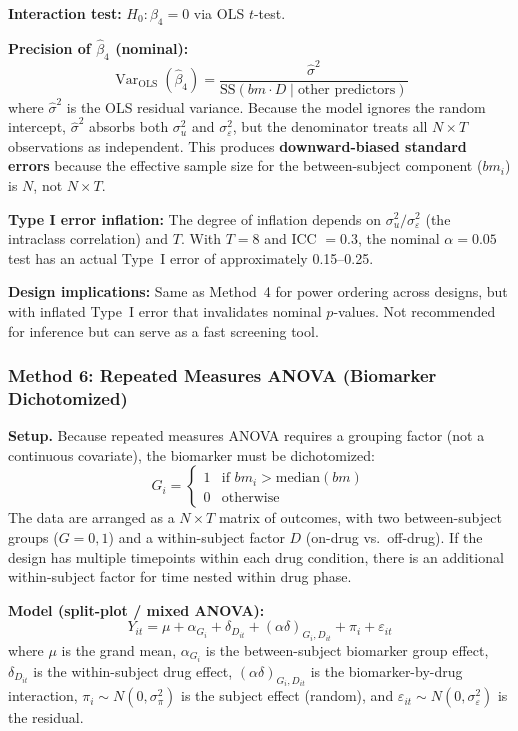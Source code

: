 \documentclass[11pt]{article}
\begin{document}
\textbf{Interaction test:} $H_0: \beta_4 = 0$ via OLS $t$-test.

\textbf{Precision of $\hat{\beta}_4$ (nominal):}
\[
\operatorname{Var}_{\text{OLS}}(\hat{\beta}_4) =
\frac{\hat{\sigma}^2}{\text{SS}(bm \cdot D \mid
\text{other predictors})}
\]
where $\hat{\sigma}^2$ is the OLS residual variance. Because the model
ignores the random intercept, $\hat{\sigma}^2$ absorbs both
$\sigma^2_u$ and $\sigma^2_\varepsilon$, but the denominator treats all
$N \times T$ observations as independent. This produces
\textbf{downward-biased standard errors} because the effective sample
size for the between-subject component ($bm_i$) is $N$, not $N \times T$.

\textbf{Type I error inflation:} The degree of inflation depends on
$\sigma^2_u / \sigma^2_\varepsilon$ (the intraclass correlation) and
$T$. With $T = 8$ and ICC $= 0.3$, the nominal $\alpha = 0.05$ test
has an actual Type~I error of approximately 0.15--0.25.

\textbf{Design implications:} Same as Method~4 for power ordering
across designs, but with inflated Type~I error that invalidates nominal
$p$-values. Not recommended for inference but can serve as a fast
screening tool.

\subsubsection{Method 6: Repeated Measures ANOVA (Biomarker Dichotomized)}

\textbf{Setup.} Because repeated measures ANOVA requires a grouping
factor (not a continuous covariate), the biomarker must be dichotomized:
\[
G_i = \begin{cases} 1 & \text{if } bm_i > \text{median}(bm) \\
0 & \text{otherwise} \end{cases}
\]
The data are arranged as a $N \times T$ matrix of outcomes, with two
between-subject groups ($G = 0, 1$) and a within-subject factor $D$
(on-drug vs.\ off-drug). If the design has multiple timepoints within
each drug condition, there is an additional within-subject factor for
time nested within drug phase.

\textbf{Model (split-plot / mixed ANOVA):}
\[
Y_{it} = \mu + \alpha_{G_i} + \delta_{D_{it}} +
(\alpha\delta)_{G_i, D_{it}} + \pi_i + \varepsilon_{it}
\]
where $\mu$ is the grand mean, $\alpha_{G_i}$ is the between-subject
biomarker group effect, $\delta_{D_{it}}$ is the within-subject drug
effect, $(\alpha\delta)_{G_i, D_{it}}$ is the biomarker-by-drug
interaction, $\pi_i \sim N(0, \sigma^2_\pi)$ is the subject effect
(random), and $\varepsilon_{it} \sim N(0, \sigma^2_\varepsilon)$ is the
residual.
\end{document}

